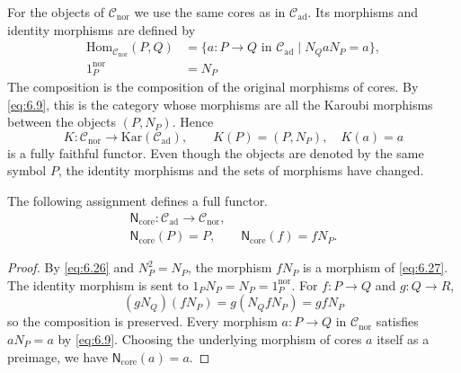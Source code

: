 \begin{construction}\label{cons:6.20}

For the objects of $\mathcal{C}_{\mathrm{nor}}$ we use the same cores as in
$\mathcal{C}_{\mathrm{ad}}$. Its morphisms and identity morphisms are defined by
\begin{equation*}
\begin{aligned}
\mathrm{Hom}_{\mathcal{C}_{\mathrm{nor}}}(P,Q)
 &=\{a:P\to Q\text{ in }\mathcal{C}_{\mathrm{ad}}\mid N_QaN_P=a\},\\
1_P^{\mathrm{nor}}&=N_P
\end{aligned}
\tag{6.27}\label{eq:6.27}
\end{equation*}
The composition is the composition of the original morphisms of cores.
By \eqref{eq:6.9}, this is the category whose morphisms are all the Karoubi morphisms between the objects
$(P,N_P)$.
Hence
\begin{equation*}
K:\mathcal{C}_{\mathrm{nor}}\longrightarrow\mathrm{Kar}(\mathcal{C}_{\mathrm{ad}}),
\qquad K(P)=(P,N_P),\quad K(a)=a
\tag{6.28}\label{eq:6.28}
\end{equation*}
is a fully faithful functor. Even though the objects are denoted by the same symbol $P$,
the identity morphisms and the sets of morphisms have changed.

\end{construction}

\begin{theorem}\label{thm:6.21}

The following assignment defines a full functor.
\begin{equation*}
\begin{gathered}
\mathsf{N}_{\mathrm{core}}:\mathcal{C}_{\mathrm{ad}}\longrightarrow\mathcal{C}_{\mathrm{nor}},\\
\mathsf{N}_{\mathrm{core}}(P)=P,\qquad
\mathsf{N}_{\mathrm{core}}(f)=fN_P.
\end{gathered}
\tag{6.29}\label{eq:6.29}
\end{equation*}

\end{theorem}

\begin{proof}

By \eqref{eq:6.26} and $N_P^2=N_P$, the morphism $fN_P$ is a morphism of \eqref{eq:6.27}.
The identity morphism is sent to $1_PN_P=N_P=1_P^{\mathrm{nor}}$.
For $f:P\to Q$ and $g:Q\to R$,
\begin{equation*}
(gN_Q)(fN_P)=g(N_QfN_P)=gfN_P
\tag{6.30}\label{eq:6.30}
\end{equation*}
so the composition is preserved.
Every morphism $a:P\to Q$ in $\mathcal{C}_{\mathrm{nor}}$ satisfies $aN_P=a$ by
\eqref{eq:6.9}.
Choosing the underlying morphism of cores $a$ itself as a preimage, we have
$\mathsf{N}_{\mathrm{core}}(a)=a$.

\end{proof}

